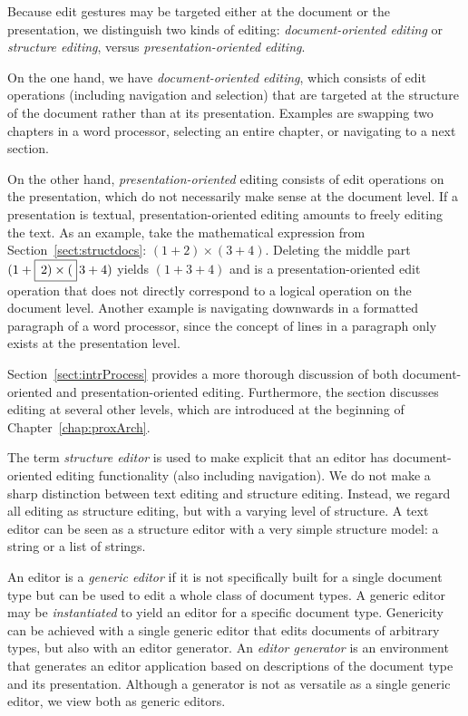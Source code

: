 
Because edit gestures may be targeted either at the document or the presentation, we distinguish two kinds of editing:  {\em document-oriented editing} or {\em structure editing}, versus {\em presentation-oriented editing}.


On the one hand, we have {\em document-oriented editing}, which consists of edit operations (including navigation and selection) that are targeted at the structure of the document rather than at its presentation. Examples are swapping two chapters in a word processor, selecting an entire chapter, or navigating to a next section.

On the other hand, {\em presentation-oriented} editing consists of edit operations on the presentation, which do not necessarily make sense at the document level. If a presentation is textual,  presentation-oriented editing amounts to freely editing the text. As an example, take the mathematical expression from Section~\ref{sect:structdocs}: 
$(1+2) \times (3+4)$. Deleting the middle part $(1+\framebox{$\,2) \times ($}\,3+4)$ yields $(1+3+4)$ and is a presentation-oriented edit operation that does not directly correspond to a logical operation on the document level. Another example is navigating downwards in a formatted paragraph of a word processor, since the concept of lines in a paragraph only exists at the presentation level. 

Section~\ref{sect:intrProcess} provides a more thorough discussion of both document-oriented and presentation-oriented editing. Furthermore, the section discusses editing at several other levels, which are introduced at the beginning of Chapter~\ref{chap:proxArch}.


The term {\em structure editor} is used to make explicit that an editor has document-oriented editing functionality (also including navigation). We do not make a sharp distinction between text editing and structure editing. Instead, we regard all editing as structure editing, but with a varying level of structure. A text editor can be seen as a structure editor with a very simple structure model: a string or a list of strings. 

An editor is a {\em generic editor} if it is not specifically built for a single document type but can be used to edit a whole class of document types. A generic editor may be {\em instantiated} to yield an editor for a specific document type. Genericity can be achieved with a single generic editor that edits documents of arbitrary types, but also with an editor generator. An {\em editor generator} is an environment that generates an editor application based on descriptions of the document type and its presentation. Although a generator is not as versatile as a single generic editor, we view both as generic editors. 

